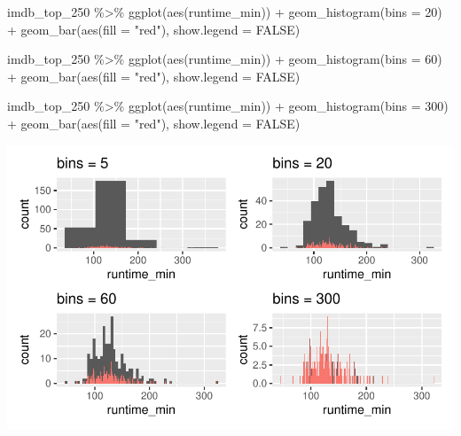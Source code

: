 \documentclass[
  letterpaper,
]{krantz}
\makeatletter
\newenvironment{Shaded}{\begin{snugshade}}{\end{snugshade}}
\newcommand{\AttributeTok}[1]{\textcolor[rgb]{0.40,0.45,0.13}{#1}}
\newcommand{\ConstantTok}[1]{\textcolor[rgb]{0.56,0.35,0.01}{#1}}
\newcommand{\DecValTok}[1]{\textcolor[rgb]{0.68,0.00,0.00}{#1}}
\newcommand{\FunctionTok}[1]{\textcolor[rgb]{0.28,0.35,0.67}{#1}}
\newcommand{\NormalTok}[1]{\textcolor[rgb]{0.00,0.23,0.31}{#1}}
\newcommand{\SpecialCharTok}[1]{\textcolor[rgb]{0.37,0.37,0.37}{#1}}
\newcommand{\StringTok}[1]{\textcolor[rgb]{0.13,0.47,0.30}{#1}}
\newenvironment{kframe}{%
\medskip{}
\setlength{\fboxsep}{.8em}
 \def\at@end@of@kframe{}%
 \ifinner\ifhmode%
  \def\at@end@of@kframe{\end{minipage}}%
  \begin{minipage}{\columnwidth}%
 \fi\fi%
 \def\FrameCommand##1{\hskip\@totalleftmargin \hskip-\fboxsep
 \colorbox{shadecolor}{##1}\hskip-\fboxsep
     \hskip-\linewidth \hskip-\@totalleftmargin \hskip\columnwidth}%
 \MakeFramed {\advance\hsize-\width
   \@totalleftmargin\z@ \linewidth\hsize
   \@setminipage}}%
 {\par\unskip\endMakeFramed%
 \at@end@of@kframe}
\renewenvironment{Shaded}{\begin{kframe}}{\end{kframe}}
\makeatother
\begin{document}
\begin{Shaded}
\begin{Highlighting}[]
\NormalTok{imdb\_top\_250 }\SpecialCharTok{\%\textgreater{}\%}
  \FunctionTok{ggplot}\NormalTok{(}\FunctionTok{aes}\NormalTok{(runtime\_min)) }\SpecialCharTok{+}
  \FunctionTok{geom\_histogram}\NormalTok{(}\AttributeTok{bins =} \DecValTok{20}\NormalTok{) }\SpecialCharTok{+}
  \FunctionTok{geom\_bar}\NormalTok{(}\FunctionTok{aes}\NormalTok{(}\AttributeTok{fill =} \StringTok{"red"}\NormalTok{), }\AttributeTok{show.legend =} \ConstantTok{FALSE}\NormalTok{)}
\end{Highlighting}
\end{Shaded}

\begin{Shaded}
\begin{Highlighting}[]
\NormalTok{imdb\_top\_250 }\SpecialCharTok{\%\textgreater{}\%}
  \FunctionTok{ggplot}\NormalTok{(}\FunctionTok{aes}\NormalTok{(runtime\_min)) }\SpecialCharTok{+}
  \FunctionTok{geom\_histogram}\NormalTok{(}\AttributeTok{bins =} \DecValTok{60}\NormalTok{) }\SpecialCharTok{+}
  \FunctionTok{geom\_bar}\NormalTok{(}\FunctionTok{aes}\NormalTok{(}\AttributeTok{fill =} \StringTok{"red"}\NormalTok{), }\AttributeTok{show.legend =} \ConstantTok{FALSE}\NormalTok{)}
\end{Highlighting}
\end{Shaded}

\begin{Shaded}
\begin{Highlighting}[]
\NormalTok{imdb\_top\_250 }\SpecialCharTok{\%\textgreater{}\%}
  \FunctionTok{ggplot}\NormalTok{(}\FunctionTok{aes}\NormalTok{(runtime\_min)) }\SpecialCharTok{+}
  \FunctionTok{geom\_histogram}\NormalTok{(}\AttributeTok{bins =} \DecValTok{300}\NormalTok{) }\SpecialCharTok{+}
  \FunctionTok{geom\_bar}\NormalTok{(}\FunctionTok{aes}\NormalTok{(}\AttributeTok{fill =} \StringTok{"red"}\NormalTok{), }\AttributeTok{show.legend =} \ConstantTok{FALSE}\NormalTok{)}
\end{Highlighting}
\end{Shaded}

\includegraphics{08_descriptive_statistics_files/figure-pdf/histograms-bins-output-1.pdf}
\end{document}
